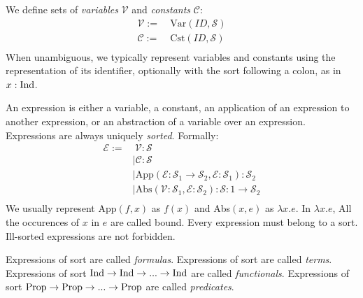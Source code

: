 \begin{definition}[Expressions]
  We define sets of \textit{variables} $\mathcal{V}$ and \textit{constants} $\mathcal{C}$:
  \begin{align}
    \mathcal{V} := & ~\text{Var}(\textit{ID}, \mathcal{S}) \\
    \mathcal{C} := & ~\text{Cst}(\textit{ID}, \mathcal{S}) \\
  \end{align}
  When unambiguous, we typically represent variables and constants using the representation of its identifier, optionally with the sort following a colon, as in $x: \text{Ind}$.

  An expression is either a variable, a constant, an application of an expression to another expression, or an abstraction of a variable over an expression. Expressions are always uniquely \textit{sorted}. Formally:
  \begin{align}
    \mathcal{E} := & ~\mathcal{V}: \mathcal{S} \\
    & \mid \mathcal{C}: \mathcal{S} \\
    & \mid \text{App}(\mathcal{E}: \mathcal{S}_1 \rightarrow \mathcal{S}_2, \mathcal{E}: \mathcal{S}_1): \mathcal{S}_2 \\
    & \mid \text{Abs}(\mathcal{V}: \mathcal{S}_1, \mathcal{E}: \mathcal{S}_2): \mathcal{S}:1 \rightarrow \mathcal{S}_2 \\
  \end{align}
  We usually represent App$(f, x)$ as $f(x)$ and Abs$(x, e)$ as $\lambda x. e$. In $\lambda x. e$, All the occurences of $x$ in $e$ are called bound.
  Every expression must belong to a sort. Ill-sorted expressions are not forbidden.

  Expressions of sort \Prop are called \textit{formulas}. Expressions of sort \Ind are called \textit{terms}.
  Expressions of sort $\text{Ind} \rightarrow \text{Ind} \rightarrow ... \rightarrow \text{Ind}$ are called \textit{functionals}.
  Expressions of sort $\text{Prop} \rightarrow \text{Prop} \rightarrow ... \rightarrow \text{Prop}$ are called \textit{predicates}.

\end{definition}

